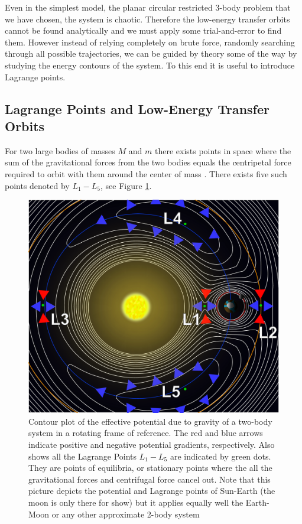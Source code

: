 Even in the simplest model, the planar circular restricted 3-body problem that we have chosen, the system is chaotic. Therefore the low-energy transfer orbits cannot be found analytically and we must apply some trial-and-error to find them. However instead of relying completely on brute force, randomly searching through all possible trajectories, we can be guided by theory some of the way by studying the energy contours of the system. To this end it is useful to introduce Lagrange points.

\subsection{Lagrange Points and Low-Energy Transfer Orbits}
For two large bodies of masses $M$ and $m$ there exists points in space where the sum of the gravitational forces from the two bodies equals the centripetal force required to orbit with them around the center of mass \cite{Murray1999}. There exists five such points denoted by $L_1 - L_5$, see Figure \ref{fig:lagrange-points}.

\begin{figure}[ht]
\centering
\includegraphics[scale=0.32]{fig/lagrange_points.pdf}
\caption{Contour plot of the effective potential due to gravity of a two-body system in a rotating frame of reference. The red and blue arrows indicate positive and negative potential gradients, respectively. Also shows all the Lagrange Points $L_1-L_5$ are indicated by green dots. They are points of equilibria, or stationary points where the all the gravitational forces and centrifugal force cancel out. Note that this picture depicts the potential and Lagrange points of Sun-Earth (the moon is only there for show) but it applies equally well the Earth-Moon or any other approximate 2-body system}
\label{fig:lagrange-points}
\end{figure}

